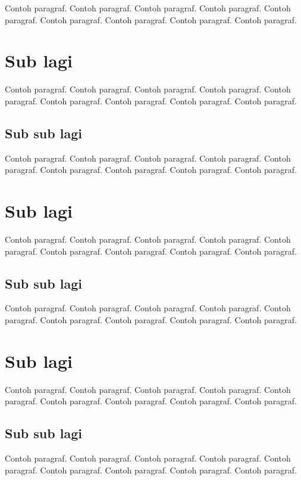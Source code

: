 \documentclass[twoside,bahasa]{tufte-book}
\begin{document}
Contoh paragraf. Contoh paragraf. Contoh paragraf. Contoh paragraf.
Contoh paragraf. Contoh paragraf. Contoh paragraf. Contoh paragraf.
Contoh paragraf.


\section{Sub lagi}

Contoh paragraf. Contoh paragraf. Contoh paragraf. Contoh paragraf.
Contoh paragraf. Contoh paragraf. Contoh paragraf. Contoh paragraf.
Contoh paragraf.

\subsection{Sub sub lagi}

Contoh paragraf. Contoh paragraf. Contoh paragraf. Contoh paragraf.
Contoh paragraf. Contoh paragraf. Contoh paragraf. Contoh paragraf.
Contoh paragraf.


\section{Sub lagi}

Contoh paragraf. Contoh paragraf. Contoh paragraf. Contoh paragraf.
Contoh paragraf. Contoh paragraf. Contoh paragraf. Contoh paragraf.
Contoh paragraf.

\subsection{Sub sub lagi}

Contoh paragraf. Contoh paragraf. Contoh paragraf. Contoh paragraf.
Contoh paragraf. Contoh paragraf. Contoh paragraf. Contoh paragraf.
Contoh paragraf.

\section{Sub lagi}

Contoh paragraf. Contoh paragraf. Contoh paragraf. Contoh paragraf.
Contoh paragraf. Contoh paragraf. Contoh paragraf. Contoh paragraf.
Contoh paragraf.

\subsection{Sub sub lagi}

Contoh paragraf. Contoh paragraf. Contoh paragraf. Contoh paragraf.
Contoh paragraf. Contoh paragraf. Contoh paragraf. Contoh paragraf.
Contoh paragraf.
\end{document}
